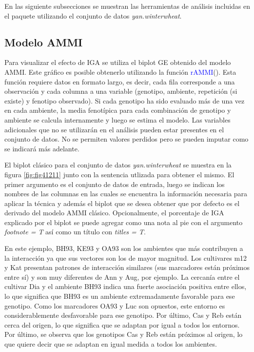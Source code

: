   
En las siguiente subsecciones se muestran las herramientas de análisis incluidas en el paquete utilizando el conjunto de datos \emph{yan.winterwheat}.  
  
\subsection{Modelo AMMI}

Para visualizar el efecto de IGA se utiliza el biplot GE obtenido del modelo AMMI. Este gráfico es posible obtenerlo utilizando la función \textcolor{blue}{rAMMI}(). Esta función requiere datos en formato largo, es decir, cada fila corresponde a una observación y cada columna a una variable (genotipo, ambiente, repetición (si existe) y fenotipo observado). Si cada genotipo ha sido evaluado más de una vez en cada ambiente, la media fenotípica para cada combinación de genotipo y ambiente se calcula internamente y luego se estima el modelo. Las variables adicionales que no se utilizarán en el análisis pueden estar presentes en el conjunto de datos. No se permiten valores perdidos pero se pueden imputar como se indicará más adelante. 

El biplot clásico para el conjunto de datos \emph{yan.winterwheat} se muestra en la figura \ref{fig:fig41211} junto con la sentencia utlizada para obtener el mismo. El primer argumento es el conjunto de datos de entrada, luego se indican los nombres de las columnas en las cuales se encuentra la información necesaria para aplicar la técnica y además el biplot que se desea obtener que por defecto es el derivado del modelo AMMI clásico. Opcionalmente, el porcentaje de IGA explicado por el biplot se puede agregar como una nota al pie con el argumento \emph{footnote = T} así como un título con \emph{titles = T}. 

En este ejemplo, BH93, KE93 y OA93 son los ambientes que más contribuyen a la interacción ya que sus vectores son los de mayor magnitud. Los cultivares m12 y Kat presentan patrones de interacción similares (sus marcadores están próximos entre sí) y son muy diferentes de Ann y Aug, por ejemplo. La cercanía entre el cultivar Dia y el ambiente BH93 indica una fuerte asociación positiva entre ellos, lo que significa que BH93 es un ambiente extremadamente favorable para ese genotipo. Como los marcadores OA93 y Luc son opuestos, este entorno es considerablemente desfavorable para ese genotipo. Por último, Cas y Reb están cerca del origen, lo que significa que se adaptan por igual a todos los entornos. Por último, se observa que los genotipos Cas y Reb están próximos al origen, lo que quiere decir que se adaptan en igual medida a todos los ambientes.

